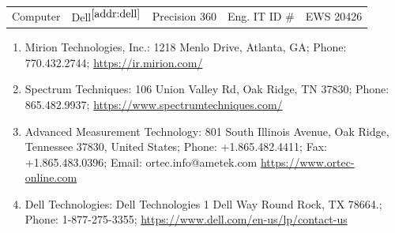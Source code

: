 \documentclass[12pt]{article}
\newcommand{\na}{\xspace$N/A$\xspace}
\newcommand{\sref}[1]{$^{\ref{#1}}$}
\begin{document}
\begin{table}[!h]
\begin{tabular}{c|cccc}
        Computer & Dell\sref{addr:dell} & Precision 360 & Eng. IT ID \# & EWS 20426 \\

    \end{tabular}
    \begin{enumerate}[label=\alph*]
        \item\label{addr:mirion}
        Mirion Technologies, Inc.:
        1218 Menlo Drive,
        Atlanta, GA;
        Phone: 770.432.2744;
        \url{https://ir.mirion.com/}
        \item\label{addr:spect}
        Spectrum Techniques:
        106 Union Valley Rd, Oak Ridge, TN 37830;
        Phone: 865.482.9937;
        \url{https://www.spectrumtechniques.com/}
        \item\label{addr:ortec}
        Advanced Measurement Technology:
        801 South Illinois Avenue,
        Oak Ridge, Tennessee 37830,
        United States;
        Phone: +1.865.482.4411;
        Fax: +1.865.483.0396;
        Email: ortec.info@ametek.com
        \url{https://www.ortec-online.com}
        \item\label{addr:dell}
        Dell Technologies:
        Dell Technologies
        1 Dell Way
        Round Rock, TX 78664.;
        Phone: 1-877-275-3355;
        \url{https://www.dell.com/en-us/lp/contact-us}
    \end{enumerate}
\end{table}
\FloatBarrier
\end{document}
